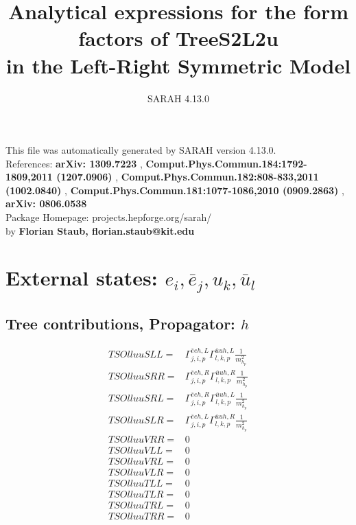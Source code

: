 \documentclass[A4,landscape]{article}
\begin{document}
\title{Analytical expressions for the form factors of TreeS2L2u\\ in the Left-Right Symmetric Model } 
 \author{SARAH 4.13.0} 
 \maketitle 
 \vspace{10cm} 
This file was automatically generated by SARAH version 4.13.0.  \\ 
References: {\bf arXiv: 1309.7223 }, {\bf Comput.Phys.Commun.184:1792-1809,2011 (1207.0906) }, {\bf Comput.Phys.Commun.182:808-833,2011 (1002.0840) }, {\bf Comput.Phys.Commun.181:1077-1086,2010 (0909.2863) }, {\bf arXiv: 0806.0538 } \\ 
Package Homepage: projects.hepforge.org/sarah/ \\ 
by {\bf Florian Staub, florian.staub@kit.edu} 
 \pagebreak 
 \tableofcontents 
 \pagebreak 
\section{External states: ${e_{{i}}, \bar{e}_{{j}}, u_{{k}}, \bar{u}_{{l}}}$} 
\subsection{Tree contributions, Propagator: $h$} 

\begin{align} 
  TSOlluuSLL= & \Gamma^{\bar{e}e h ,L}_{j, i, p} \Gamma^{\bar{u}u h ,L}_{l, k, p} \frac{1}{m^2_{h_{{p}}}} \\ 
  TSOlluuSRR= & \Gamma^{\bar{e}e h ,R}_{j, i, p} \Gamma^{\bar{u}u h ,R}_{l, k, p} \frac{1}{m^2_{h_{{p}}}} \\ 
  TSOlluuSRL= & \Gamma^{\bar{e}e h ,R}_{j, i, p} \Gamma^{\bar{u}u h ,L}_{l, k, p} \frac{1}{m^2_{h_{{p}}}} \\ 
  TSOlluuSLR= & \Gamma^{\bar{e}e h ,L}_{j, i, p} \Gamma^{\bar{u}u h ,R}_{l, k, p} \frac{1}{m^2_{h_{{p}}}} \\ 
  TSOlluuVRR= & 0 \\ 
  TSOlluuVLL= & 0 \\ 
  TSOlluuVRL= & 0 \\ 
  TSOlluuVLR= & 0 \\ 
  TSOlluuTLL= & 0 \\ 
  TSOlluuTLR= & 0 \\ 
  TSOlluuTRL= & 0 \\ 
  TSOlluuTRR= & 0 \\ 
\end{align} 
\end{document}
